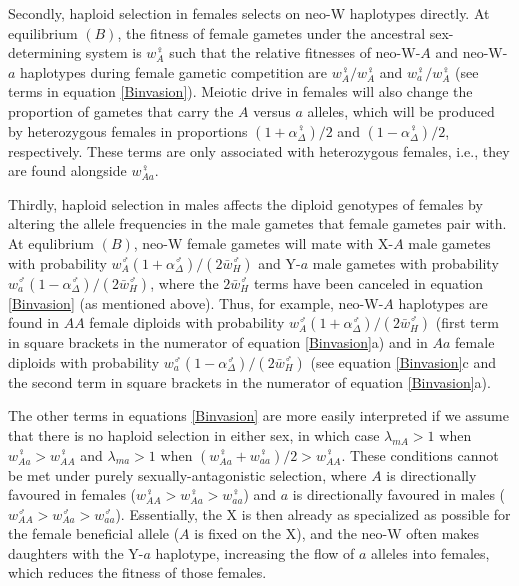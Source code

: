 \documentclass[12pt]{article}
\begin{document}
Secondly, haploid selection in females selects on neo-W haplotypes directly.
At equilibrium $(B)$, the fitness of female gametes under the ancestral sex-determining system is $w_{A}^\female$ such that the relative fitnesses of neo-W-$A$ and neo-W-$a$ haplotypes during female gametic competition are $w_{A}^\female/w_{A}^\female$ and $w_{a}^\female/w_{A}^\female$ (see terms in equation \ref{Binvasion}). 
Meiotic drive in females will also change the proportion of gametes that carry the $A$ versus $a$ alleles, which will be produced by heterozygous females in proportions $(1+\alpha_{\Delta}^\female)/2$ and $(1-\alpha_{\Delta}^\female)/2$, respectively. 
These terms are only associated with heterozygous females, i.e., they are found alongside $w_{Aa}^\female$.

Thirdly, haploid selection in males affects the diploid genotypes of females by altering the allele frequencies in the male gametes that female gametes pair with.
At equlibrium $(B)$, neo-W female gametes will mate with X-$A$ male gametes with probability $ w_A^\male (1+\alpha^\male_\Delta) / (2\bar{w}_{H}^\male)$ and Y-$a$ male gametes with probability $w_a^\male (1-\alpha^\male_\Delta) / (2\bar{w}_{H}^\male)$, where the $2\bar{w}_{H}^\male$ terms have been canceled in equation \eqref{Binvasion} (as mentioned above). 
Thus, for example, neo-W-$A$ haplotypes are found in $AA$ female diploids with probability $ w_A^\male (1+\alpha^\male_\Delta)/ (2\bar{w}_{H}^\male)$ (first term in square brackets in the numerator of equation \ref{Binvasion}a) and in $Aa$ female diploids with probability $w_a^\male (1-\alpha^\male_\Delta) / (2\bar{w}_{H}^\male)$ (see equation \ref{Binvasion}c and the second term in square brackets in the numerator of equation \ref{Binvasion}a).


The other terms in equations \eqref{Binvasion} are more easily interpreted if we assume that there is no haploid selection in either sex, in which case $\lambda_{mA}>1$ when $w_{Aa}^\female>w_{AA}^\female$ and $\lambda_{ma}>1$ when $(w_{Aa}^\female+w_{aa}^\female)/2>w_{AA}^\female$.
These conditions cannot be met under purely sexually-antagonistic selection, where $A$ is directionally favoured in females ($w_{AA}^\female>w_{Aa}^\female>w_{aa}^\female$) and $a$ is directionally favoured in males ($w_{AA}^\male>w_{Aa}^\male>w_{aa}^\male$).  
Essentially, the X is then already as specialized as possible for the female beneficial allele ($A$ is fixed on the X), and the neo-W often makes daughters with the Y-$a$ haplotype, increasing the flow of $a$ alleles into females, which reduces the fitness of those females.  
\end{document}
